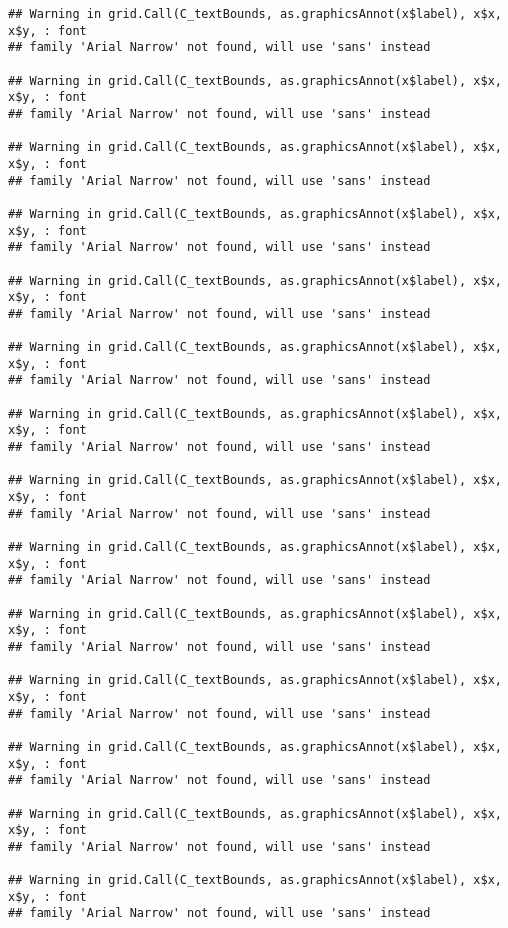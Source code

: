 \documentclass[
]{article}
\begin{document}
\begin{verbatim}
## Warning in grid.Call(C_textBounds, as.graphicsAnnot(x$label), x$x, x$y, : font
## family 'Arial Narrow' not found, will use 'sans' instead

## Warning in grid.Call(C_textBounds, as.graphicsAnnot(x$label), x$x, x$y, : font
## family 'Arial Narrow' not found, will use 'sans' instead

## Warning in grid.Call(C_textBounds, as.graphicsAnnot(x$label), x$x, x$y, : font
## family 'Arial Narrow' not found, will use 'sans' instead

## Warning in grid.Call(C_textBounds, as.graphicsAnnot(x$label), x$x, x$y, : font
## family 'Arial Narrow' not found, will use 'sans' instead

## Warning in grid.Call(C_textBounds, as.graphicsAnnot(x$label), x$x, x$y, : font
## family 'Arial Narrow' not found, will use 'sans' instead

## Warning in grid.Call(C_textBounds, as.graphicsAnnot(x$label), x$x, x$y, : font
## family 'Arial Narrow' not found, will use 'sans' instead

## Warning in grid.Call(C_textBounds, as.graphicsAnnot(x$label), x$x, x$y, : font
## family 'Arial Narrow' not found, will use 'sans' instead

## Warning in grid.Call(C_textBounds, as.graphicsAnnot(x$label), x$x, x$y, : font
## family 'Arial Narrow' not found, will use 'sans' instead

## Warning in grid.Call(C_textBounds, as.graphicsAnnot(x$label), x$x, x$y, : font
## family 'Arial Narrow' not found, will use 'sans' instead

## Warning in grid.Call(C_textBounds, as.graphicsAnnot(x$label), x$x, x$y, : font
## family 'Arial Narrow' not found, will use 'sans' instead

## Warning in grid.Call(C_textBounds, as.graphicsAnnot(x$label), x$x, x$y, : font
## family 'Arial Narrow' not found, will use 'sans' instead

## Warning in grid.Call(C_textBounds, as.graphicsAnnot(x$label), x$x, x$y, : font
## family 'Arial Narrow' not found, will use 'sans' instead

## Warning in grid.Call(C_textBounds, as.graphicsAnnot(x$label), x$x, x$y, : font
## family 'Arial Narrow' not found, will use 'sans' instead

## Warning in grid.Call(C_textBounds, as.graphicsAnnot(x$label), x$x, x$y, : font
## family 'Arial Narrow' not found, will use 'sans' instead


\end{verbatim}
\end{document}
